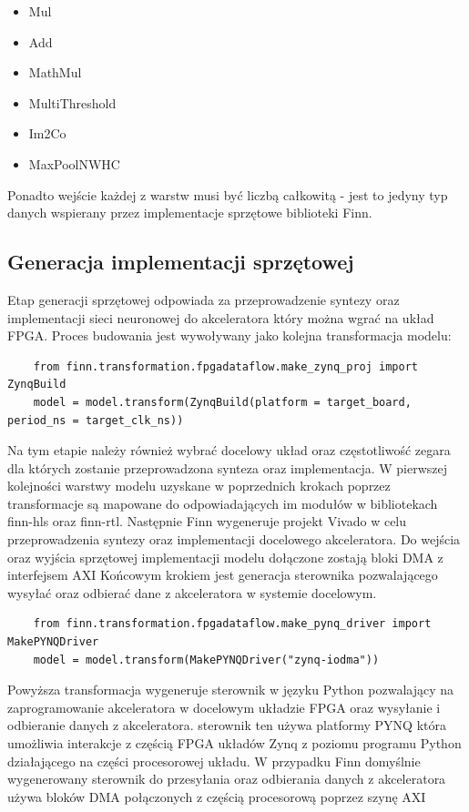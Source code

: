 \documentclass[../main.tex]{subfiles}
\begin{document}
\begin{itemize}
    \item Mul 
    \item Add
    \item MathMul
    \item MultiThreshold
    \item Im2Co
    \item MaxPoolNWHC
\end{itemize}

Ponadto wejście każdej z warstw musi być liczbą całkowitą - jest to jedyny typ danych wspierany przez implementacje sprzętowe biblioteki Finn.

\subsection{Generacja implementacji sprzętowej}

Etap generacji sprzętowej odpowiada za przeprowadzenie syntezy oraz implementacji sieci neuronowej do akceleratora który można wgrać na układ FPGA. Proces budowania jest wywoływany 
jako kolejna transformacja modelu:

\begin{verbatim}
    from finn.transformation.fpgadataflow.make_zynq_proj import ZynqBuild
    model = model.transform(ZynqBuild(platform = target_board, period_ns = target_clk_ns))
\end{verbatim}

Na tym etapie należy również wybrać docelowy układ oraz częstotliwość zegara dla których zostanie przeprowadzona synteza oraz implementacja. W pierwszej kolejności warstwy modelu uzyskane
w poprzednich krokach poprzez transformacje są mapowane do odpowiadających im modułów w bibliotekach finn-hls oraz finn-rtl. Następnie Finn wygeneruje projekt Vivado w celu przeprowadzenia 
syntezy oraz implementacji docelowego akceleratora. Do wejścia oraz wyjścia sprzętowej implementacji modelu dołączone zostają bloki DMA z interfejsem AXI
Końcowym krokiem jest generacja sterownika pozwalającego wysyłać oraz odbierać dane z akceleratora w systemie docelowym.

\begin{verbatim}
    from finn.transformation.fpgadataflow.make_pynq_driver import MakePYNQDriver
    model = model.transform(MakePYNQDriver("zynq-iodma"))
\end{verbatim}

Powyższa transformacja wygeneruje sterownik w języku Python pozwalający na zaprogramowanie akceleratora w docelowym układzie FPGA oraz wysyłanie i odbieranie danych z akceleratora. sterownik
ten używa platformy PYNQ która umożliwia interakcje z częścią FPGA układów Zynq z poziomu programu Python działającego na części procesorowej układu. W przypadku Finn domyślnie wygenerowany sterownik do 
przesyłania oraz odbierania danych z akceleratora używa bloków DMA połączonych z częścią procesorową poprzez szynę AXI
\end{document}
